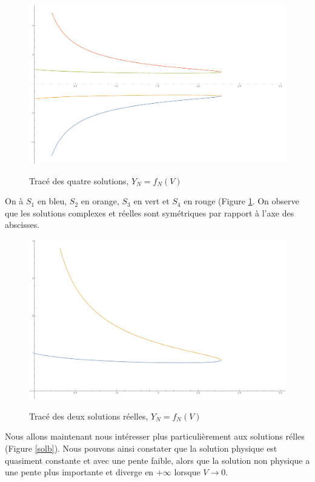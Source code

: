 \documentclass[12pt]{article}
\begin{document}
\begin{figure}
\caption{Trac\'e des quatre solutions, $Y_N = f_N(V)$}
\includegraphics[width = \textwidth]{Courbes4.png}
 \label{Sola}
\end{figure}
 On \`a $S_1$ en bleu, $S_2$ en orange, $S_3$ en vert et $S_4$ en rouge (Figure \ref{Sola}.
 \newline
On observe que les solutions complexes et r\'eelles sont sym\'etriques par rapport \`a l'axe des abscisses.
\begin{figure}
\caption{Trac\'e des deux solutions r\'eelles, $Y_N = f_N(V)$}
\includegraphics[width = \textwidth]{Courbes2.png}
 \label{Solb}
\end{figure}

Nous allons maintenant nous int\'eresser plus particuli\`erement aux solutions r\'elles (Figure \ref{solb}).
\newline
Nous pouvons ainsi constater que la 
solution physique est quasiment constante et avec une pente faible, alors que la solution non physique a une pente plus importante et diverge en $+\infty$ lorsque
$V\rightarrow0$.
\end{document}
